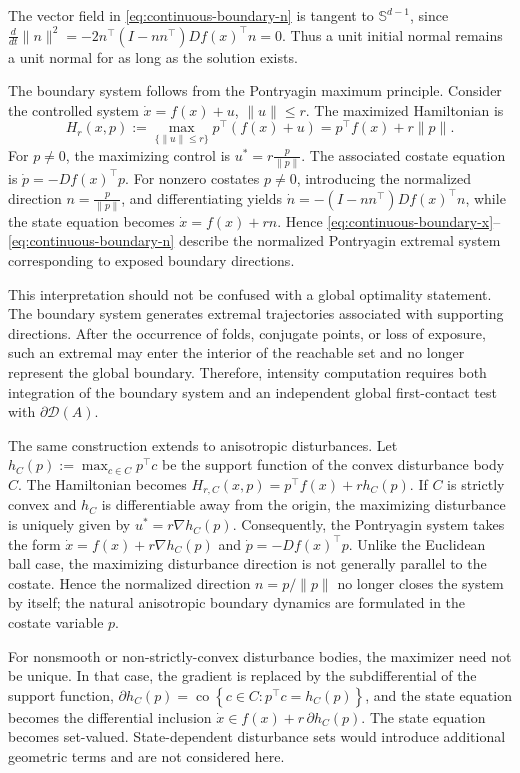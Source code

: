 \documentclass[pdflatex,sn-mathphys-num]{sn-jnl}
\numberwithin{equation}{section}
\theoremstyle{thmstyleone}%
\theoremstyle{definition}
\theoremstyle{remark}
\begin{document}
The vector field in \eqref{eq:continuous-boundary-n} is tangent to $\mathbb S^{d-1}$, since
    $\frac{d}{dt}\|n\|^2
    =
    -2n^\top(I-nn^\top)Df(x)^\top n
    =
    0.$
Thus a unit initial normal remains a unit normal for as long as the solution exists.

The boundary system follows from the Pontryagin maximum principle. Consider the controlled system
$\dot x=f(x)+u$, $\|u\|\leq r$. The maximized Hamiltonian is
\[
    H_r(x,p)
    :=
    \max_{\{\|u\|\leq r\}}
    p^\top(f(x)+u)
    =
    p^\top f(x)+r\|p\|.
\]
For $p\neq0$, the maximizing control is $u^\ast = r\frac{p}{\|p\|}$. The associated costate equation is $\dot p=-Df(x)^\top p$.  For nonzero costates $p\neq0$, introducing the normalized direction $n=\frac{p}{\|p\|}$, and differentiating yields $\dot n = -(I-nn^\top)Df(x)^\top n$, while the state equation becomes $\dot x=f(x)+rn$. Hence \eqref{eq:continuous-boundary-x}--\eqref{eq:continuous-boundary-n} describe the normalized Pontryagin extremal system corresponding to exposed boundary directions.

This interpretation should not be confused with a global optimality statement. The boundary system generates extremal trajectories associated with supporting directions. After the occurrence of folds, conjugate points, or loss of exposure, such an extremal may enter the interior of the reachable set and no longer represent the global boundary. Therefore, intensity computation requires both integration of the boundary system and an independent global first-contact test with $\partial\mathcal D(A)$.

The same construction extends to anisotropic disturbances. Let $h_C(p) := \max_{c\in C}p^\top c$
be the support function of the convex disturbance body $C$. The Hamiltonian becomes $H_{r,C}(x,p) = p^\top f(x)+r h_C(p)$. If $C$ is strictly convex and $h_C$ is differentiable away from the origin, the maximizing disturbance is uniquely given by $u^\ast = r\nabla h_C(p)$. Consequently, the Pontryagin system takes the form $\dot x = f(x)+r\nabla h_C(p)$ and $\dot p = -Df(x)^\top p$. Unlike the Euclidean ball case, the maximizing disturbance direction is not generally parallel to the costate. Hence the normalized direction $n=p/\|p\|$ no longer closes the system by itself; the natural anisotropic boundary dynamics are formulated in the costate variable $p$.

For nonsmooth or non-strictly-convex disturbance bodies, the maximizer need not be unique. In that case, the gradient is replaced by the subdifferential of the support function,
$\partial h_C(p)
    =
    \operatorname{co}
    \left\{
        c\in C:
        p^\top c=h_C(p)
    \right\}$,
and the state equation becomes the differential inclusion
$\dot x
    \in
    f(x)+r\,\partial h_C(p)$.
The state equation becomes set-valued. State-dependent disturbance sets would introduce additional geometric terms and are not considered here.
\end{document}

